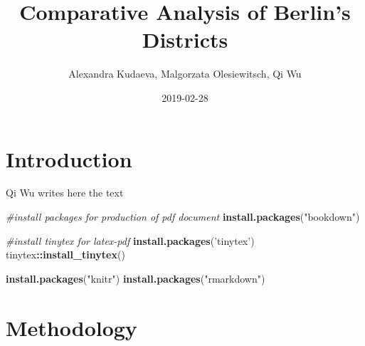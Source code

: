 \documentclass[]{book}
\title{Comparative Analysis of Berlin's Districts}
\author{Alexandra Kudaeva, Malgorzata Olesiewitsch, Qi Wu}
\date{2019-02-28}
\newenvironment{Shaded}{\begin{snugshade}}{\end{snugshade}}
\newcommand{\KeywordTok}[1]{\textcolor[rgb]{0.13,0.29,0.53}{\textbf{#1}}}
\newcommand{\StringTok}[1]{\textcolor[rgb]{0.31,0.60,0.02}{#1}}
\newcommand{\CommentTok}[1]{\textcolor[rgb]{0.56,0.35,0.01}{\textit{#1}}}
\newcommand{\OperatorTok}[1]{\textcolor[rgb]{0.81,0.36,0.00}{\textbf{#1}}}
\newcommand{\NormalTok}[1]{#1}
\begin{document}
\maketitle

{
\setcounter{tocdepth}{1}
\tableofcontents
}
\chapter{Introduction}\label{introduction}

Qi Wu writes here the text

\begin{Shaded}
\begin{Highlighting}[]
\CommentTok{#install packages for production of pdf document}
\KeywordTok{install.packages}\NormalTok{(}\StringTok{"bookdown"}\NormalTok{)}

\CommentTok{#install tinytex for latex-pdf}
\KeywordTok{install.packages}\NormalTok{(}\StringTok{'tinytex'}\NormalTok{)}
\NormalTok{tinytex}\OperatorTok{::}\KeywordTok{install_tinytex}\NormalTok{()}

\KeywordTok{install.packages}\NormalTok{(}\StringTok{"knitr"}\NormalTok{)}
\KeywordTok{install.packages}\NormalTok{(}\StringTok{"rmarkdown"}\NormalTok{)}
\end{Highlighting}
\end{Shaded}

\chapter{Methodology}\label{methodology}
\end{document}
